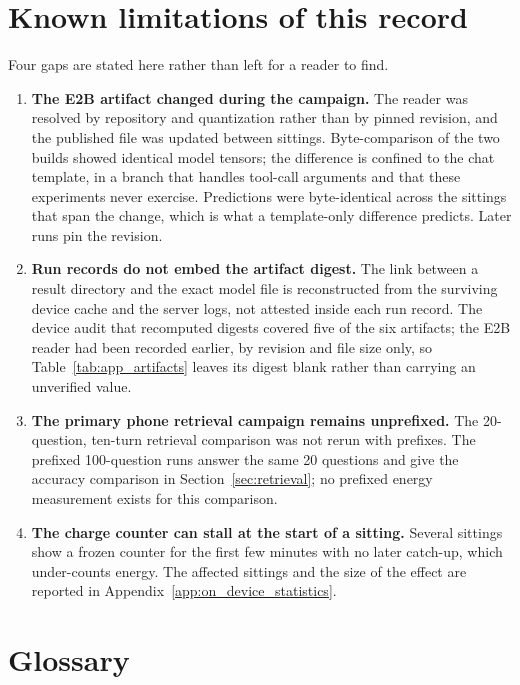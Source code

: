 \section{Known limitations of this record}
\label{app:repro_limits}

Four gaps are stated here rather than left for a reader to find.

\begin{enumerate}
  \item \textbf{The E2B artifact changed during the campaign.} The reader was resolved by
        repository and quantization rather than by pinned revision, and the published file was
        updated between sittings. Byte-comparison of the two builds showed identical model
        tensors; the difference is confined to the chat template, in a branch that handles
        tool-call arguments and that these experiments never exercise. Predictions were
        byte-identical across the sittings that span the change, which is what a
        template-only difference predicts. Later runs pin the revision.
  \item \textbf{Run records do not embed the artifact digest.} The link between a result
        directory and the exact model file is reconstructed from the surviving device cache
        and the server logs, not attested inside each run record. The device audit that
        recomputed digests covered five of the six artifacts; the E2B reader had been
        recorded earlier, by revision and file size only, so Table~\ref{tab:app_artifacts}
        leaves its digest blank rather than carrying an unverified value.
  \item \textbf{The primary phone retrieval campaign remains unprefixed.} The 20-question,
        ten-turn retrieval comparison was not rerun with prefixes. The prefixed 100-question
        runs answer the same 20 questions and give the accuracy comparison in
        Section~\ref{sec:retrieval}; no prefixed energy measurement exists for this comparison.
  \item \textbf{The charge counter can stall at the start of a sitting.} Several sittings show
        a frozen counter for the first few minutes with no later catch-up, which under-counts
        energy. The affected sittings and the size of the effect are reported in
        Appendix~\ref{app:on_device_statistics}.
\end{enumerate}

\section{Glossary}
\label{app:repro_glossary}

